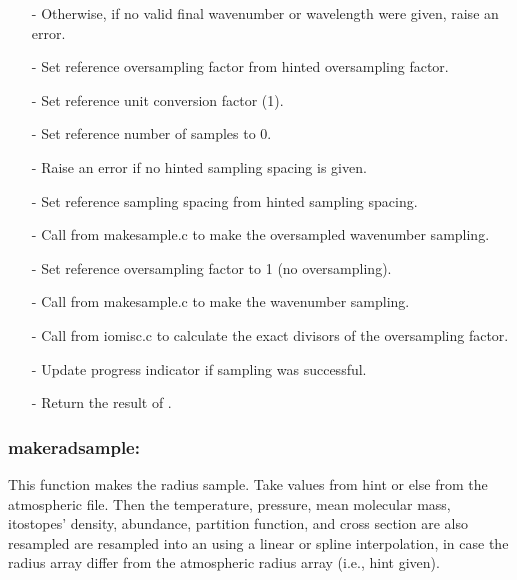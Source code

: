 \documentclass[letterpaper,12pt]{article}
\begin{document}
\begin{enumerate}[leftmargin=10pt, noitemsep, parsep=0pt, topsep=0ex]
\item[-] Otherwise, if no valid final wavenumber or wavelength were given, raise an error.
\item[-] Set reference oversampling factor from hinted oversampling factor.
\item[-] Set reference unit conversion factor (1).
\item[-] Set reference number of samples to 0.
\item[-] Raise an error if no hinted sampling spacing is given.
\item[-] Set reference sampling spacing from hinted sampling spacing.
\item[-] Call  from makesample.c to make the oversampled wavenumber sampling.
\item[-] Set reference oversampling factor to 1 (no oversampling).
\item[-] Call  from makesample.c to make the wavenumber sampling.
\item[-] Call  from iomisc.c to calculate the exact divisors of the oversampling factor.
\item[-] Update progress indicator if sampling was successful.
\item[-] Return the result of .
\end{enumerate}

\subsubsection{makeradsample:}
This function makes the radius sample.  Take values from hint or else
from the atmospheric file.  Then the temperature, pressure, mean
molecular mass, itostopes' density, abundance, partition function, and
cross section are also resampled are resampled into an using a linear
or spline interpolation, in case the radius array differ from the
atmospheric radius array (i.e., hint given). \newline
\end{document}
